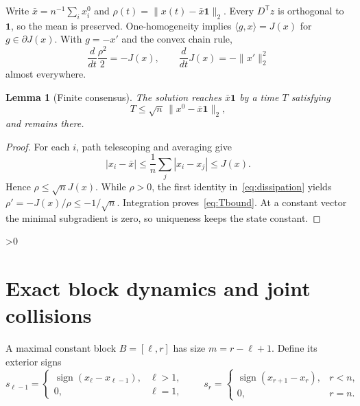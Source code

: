 \documentclass[10pt]{article}
\providecommand{\CRevisionRound}{2}
\newtheorem{lemma}{Lemma}
\begin{document}
Write $\bar x=n^{-1}\sum_i x_i^0$ and
$\rho(t)=\lVert x(t)-\bar x\mathbf1\rVert_2$.  Every $D^{\mathsf T}z$ is
orthogonal to $\mathbf1$, so the mean is preserved.  One-homogeneity implies
$\langle g,x\rangle=J(x)$ for $g\in\partial J(x)$.  With $g=-x'$ and the
convex chain rule,
\begin{equation}\label{eq:dissipation}
 \frac{d}{dt}\frac{\rho^2}{2}=-J(x),\qquad
 \frac{d}{dt}J(x)=-\lVert x'\rVert_2^2
\end{equation}
almost everywhere.

\begin{lemma}[Finite consensus]\label{lem:consensus}
The solution reaches $\bar x\mathbf1$ by a time $T$ satisfying
\begin{equation}\label{eq:Tbound}
 T\leq\sqrt n\,\lVert x^0-\bar x\mathbf1\rVert_2,
\end{equation}
and remains there.
\end{lemma}
\begin{proof}
For each $i$, path telescoping and averaging give
\[
 |x_i-\bar x|\leq\frac1n\sum_j|x_i-x_j|\leq J(x).
\]
Hence $\rho\leq\sqrt n J(x)$.  While $\rho>0$, the first identity
in~\eqref{eq:dissipation} yields
$\rho'=-J(x)/\rho\leq-1/\sqrt n$.  Integration proves~\eqref{eq:Tbound}.
At a constant vector the minimal subgradient is zero, so uniqueness keeps the
state constant.
\end{proof}

\ifnum\CRevisionRound>0
\section{Exact block dynamics and joint collisions}
A maximal constant block $B=[\ell,r]$ has size $m=r-\ell+1$.  Define its
exterior signs
\[
 s_{\ell-1}=\begin{cases}\operatorname{sign}(x_\ell-x_{\ell-1}),&\ell>1,\\0,&\ell=1,
 \end{cases}\qquad
 s_r=\begin{cases}\operatorname{sign}(x_{r+1}-x_r),&r<n,\\0,&r=n.
 \end{cases}
\]
\end{document}

